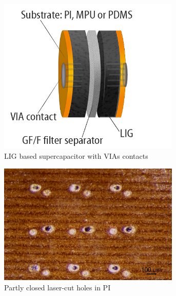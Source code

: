 \begin{figure}[H]
\begin{subfigure}{0.33\textwidth}
\includegraphics[width=0.95\textwidth]{Figures/ExperimentalSetup/Super_Cap_VIAS.jpg}
\captionsetup{width=0.9\linewidth}
\caption{LIG based supercapacitor with VIAs contacts}
\label{fig:Super_Cap_VIAS}
\end{subfigure}
\begin{subfigure}{0.33\textwidth}
\includegraphics[width=0.95\textwidth]{Figures/ExperimentalSetup/Holes made after LIG strange white dots sample 13.png} 
\captionsetup{width=0.9\linewidth}
\caption{Partly closed laser-cut holes in PI}
\label{fig:PI_VIAS_contact}
\end{subfigure}
\begin{subfigure}{0.33\textwidth}

\end{subfigure}
\end{figure}
